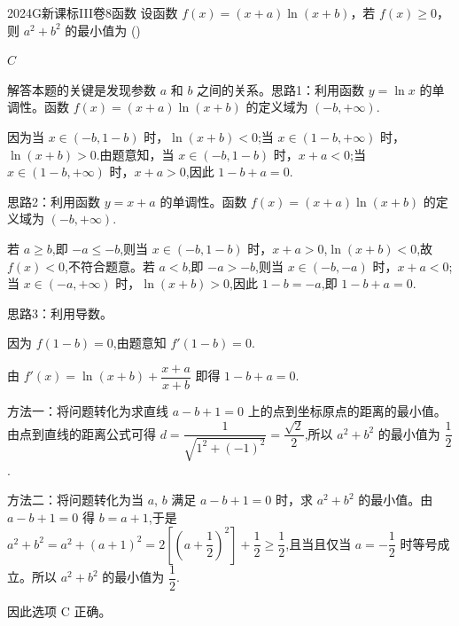 
\begin{problem}{2024}{G}{新课标III卷}{8}{函数}
设函数 $f(x)=(x+a)\ln(x+b)$，若 $f(x)\geqslant 0$，则 $a^2+b^2$ 的最小值为
(\hspace{1cm})
\begin{choices}
\end{choices}
\end{problem}

\begin{answer}
$C$
\end{answer}

\begin{solutions}
解答本题的关键是发现参数 $a$ 和 $b$ 之间的关系。思路1：利用函数 $y=\ln x$ 的单调性。函数 $f(x)=(x+a)\ln(x+b)$ 的定义域为 $(-b,+\infty)$.

因为当 $x\in(-b,1-b)$ 时，$\ln(x+b)<0$;当 $x\in(1-b,+\infty)$ 时，$\ln(x+b)>0$.由题意知，当 $x\in(-b,1-b)$ 时，$x+a<0$;当 $x\in(1-b,+\infty)$ 时，$x+a>0$,因此 $1-b+a=0$.

思路2：利用函数 $y=x+a$ 的单调性。函数 $f(x)=(x+a)\ln(x+b)$ 的定义域为 $(-b,+\infty)$.

若 $a\geq b$,即 $-a\leq -b$,则当 $x\in(-b,1-b)$ 时，$x+a>0$,$\ln(x+b)<0$,故 $f(x)<0$,不符合题意。若 $a<b$,即 $-a>-b$,则当 $x\in(-b,-a)$ 时，$x+a<0$;当 $x\in(-a,+\infty)$ 时，$\ln(x+b)>0$,因此 $1-b=-a$,即 $1-b+a=0$.

思路3：利用导数。

因为 $f(1-b)=0$,由题意知 $f'(1-b)=0$.

由 $f'(x)=\ln(x+b)+\dfrac{x+a}{x+b}$ 即得 $1-b+a=0$.

方法一：将问题转化为求直线 $a-b+1=0$ 上的点到坐标原点的距离的最小值。由点到直线的距离公式可得 $d=\dfrac{1}{\sqrt{1^2+(-1)^2}}=\dfrac{\sqrt{2}}{2}$,所以 $a^2+b^2$ 的最小值为 $\dfrac{1}{2}$.

方法二：将问题转化为当 $a$, $b$ 满足 $a-b+1=0$ 时，求 $a^2+b^2$ 的最小值。由 $a-b+1=0$ 得 $b=a+1$,于是 $a^2+b^2=a^2+(a+1)^2=2\left[\left(a+\dfrac{1}{2}\right)^2\right]+\dfrac{1}{2}\geqslant\dfrac{1}{2}$,且当且仅当 $a=-\dfrac{1}{2}$ 时等号成立。所以 $a^2+b^2$ 的最小值为 $\dfrac{1}{2}$.

因此选项 C 正确。
\end{solutions}